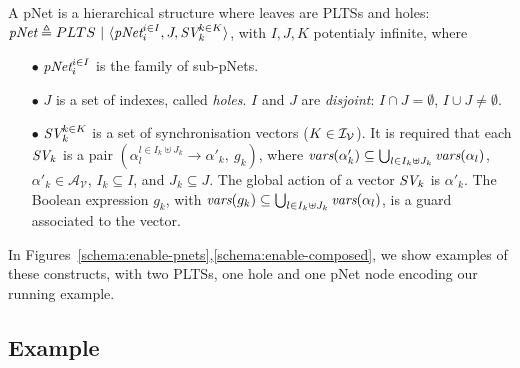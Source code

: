 \documentclass[smallcondensed]{svjour3}
\newcommand{\cA}{\ensuremath{\mathcal{A}}}
\newcommand{\cV}{\ensuremath{\mathcal{V}}}
\newcommand{\variables}{\ensuremath{\cV}}
\newcommand{\actions}[1]{\ensuremath{\cA_{#1}}}
\def\AlgAS{\mathcal{A}_S}
\begin{document}
\begin{definition}[pNets]\label{def-pnets}
	A pNet is a hierarchical structure where leaves are PLTSs and holes:
	$\pNet\triangleq PLTS~|~\langle \pNet_i^{i\in I}, J, \symb{SV}_k^{k\in 
		K}\rangle$, with $I, J, K$ potentialy infinite,
	where
	\begin{itemize}
		\item[$\bullet$] $\pNet_i^{i\in I}$ is the family of sub-pNets.
		
		\item[$\bullet$] $J$ is a set of indexes, called \emph{holes}.
		$I$ and $J$ are \emph{disjoint}: $I\!\cap\! J=\emptyset$,  $I\!\cup\! J\neq\emptyset$.
		
		\item[$\bullet$] $\symb{SV}_k^{k\in K}$ is a set of
		synchronisation vectors ($K\in\mathcal{I}_\mathcal V$).  It is required that each
		$\symb{SV}_k$ is a pair $(\alpha_{l}^{l\in I_k \uplus J_k}\to\alpha'_k,\ g_k)$, where
		$\vars(\alpha'_k)\subseteq \bigcup_{l\in I_k\uplus 
			J_k}{\vars({\alpha_l})}$, $\alpha'_k\in \actions{\variables}$, $I_k\subseteq I$, and $J_k\subseteq J$. The global action of a vector $\symb{SV}_k$ is
		$\alpha'_k$. The Boolean expression $g_k $, with $\vars(g_k)\subseteq \bigcup_{l\in 
			I_k\uplus J_k}{\vars({\alpha_l})}$, is a guard associated to the vector.
		
	\end{itemize}
\end{definition}

In Figures~\ref{schema:enable-pnets},\ref{schema:enable-composed}, we show
examples of these constructs, with two PLTSs, one hole and one pNet
node encoding our running example. 

\subsection{Example}
\label{section:running-example}
\end{document}
